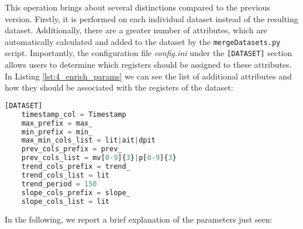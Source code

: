 This operation brings about several distinctions compared to the previous version. Firstly, it is performed on each individual dataset instead of the resulting dataset. Additionally, there are a greater number of attributes, which are automatically calculated and added to the dataset by the \texttt{mergeDatasets.py} script. Importantly, the configuration file \textit{config.ini} under the \texttt{[DATASET]} section allows users to determine which registers should be assigned to these attributes.\newline
In Listing \ref{lst:4_enrich_params} we can see the list of additional attributes and how they should be associated with the registers of the dataset:

\begin{lstlisting}[language=Python,numbers=none,caption={\texttt{config.ini} parameters for dataset enriching},label=lst:4_enrich_params]
	[DATASET]
	timestamp_col = Timestamp
	max_prefix = max_
	min_prefix = min_
	max_min_cols_list = lit|ait|dpit
	prev_cols_prefix = prev_
	prev_cols_list = mv[0-9]{3}|p[0-9]{3}
	trend_cols_prefix = trend_
	trend_cols_list = lit
	trend_period = 150
	slope_cols_prefix = slope_
	slope_cols_list = lit
\end{lstlisting}

\noindent In the following, we report a brief explanation of the parameters just seen:

